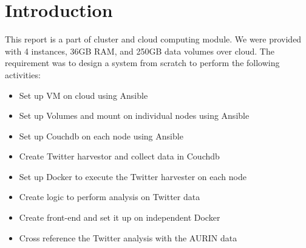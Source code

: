 \section{Introduction}
This report is a part of cluster and cloud computing module. We were provided with 4 instances, 36GB RAM, and 250GB data volumes over cloud. The requirement was to design a system from scratch to perform the following activities:
\begin{itemize}
	\item Set up VM on cloud using Ansible
	\item Set up Volumes and mount on individual nodes using Ansible
	\item Set up Couchdb on each node using Ansible
	\item Create Twitter harvestor and collect data in Couchdb
	\item Set up Docker to execute the Twitter harvester on each node
	\item Create logic to perform analysis on Twitter data
	\item Create front-end and set it up on independent Docker
	\item Cross reference the Twitter analysis with the AURIN data
\end{itemize}
